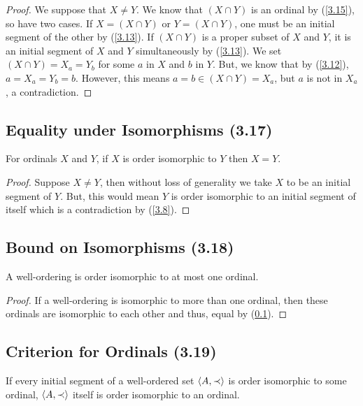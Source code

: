 \begin{proof}
    We suppose that $X \neq Y$. We know that $(X \cap Y)$ is an ordinal
    by (\ref{3.15}), so have two cases.
    If $X = (X \cap Y)$ or $Y = (X \cap Y)$, one must
    be an initial segment of the other by (\ref{3.13}).
    If $(X \cap Y)$ is a proper subset of $X$ and $Y$,
    it is an initial segment of $X$ and $Y$ simultaneously by (\ref{3.13}).
    We set $(X \cap Y) = X_a = Y_b$ for some $a$ in $X$ and
    $b$ in $Y$. But, we know that by (\ref{3.12}),
    $a = X_a = Y_b = b$. However, this means 
    $a = b \in (X \cap Y) = X_a$, but $a$ is not in $X_a$, a contradiction.
\end{proof}

\subsection{Equality under Isomorphisms (3.17)} \label{3.17}

For ordinals $X$ and $Y$, if $X$ is order isomorphic to $Y$ then $X = Y$.

\begin{proof}
    Suppose $X \neq Y$, then without loss of generality we take
    $X$ to be an initial segment of $Y$. But, this would
    mean $Y$ is order isomorphic to an initial segment of itself
    which is a contradiction by (\ref{3.8}).
\end{proof}

\subsection{Bound on Isomorphisms (3.18)} \label{3.18}

A well-ordering is order isomorphic to at most one ordinal.

\begin{proof}
    If a well-ordering is isomorphic to more than one
    ordinal, then these ordinals are isomorphic to each other
    and thus, equal by (\ref{3.17}).
\end{proof}

\subsection{Criterion for Ordinals (3.19)} \label{3.19}

If every initial segment of a well-ordered set ${\langle A, \prec \rangle}$ is 
order isomorphic to some ordinal, ${\langle A, \prec \rangle}$ itself
is order isomorphic to an ordinal.

